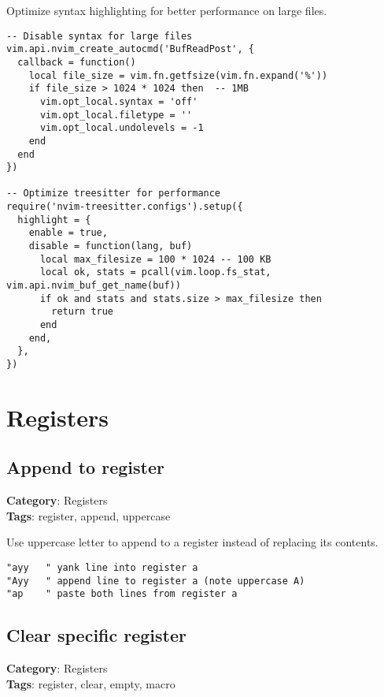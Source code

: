 {{{{{{{{{Optimize syntax highlighting for better performance on large files.

\begin{Exa*}{}
\begin{Verbatim}[fontsize=\footnotesize, breaklines, breakanywhere]
-- Disable syntax for large files
vim.api.nvim_create_autocmd('BufReadPost', {
  callback = function()
    local file_size = vim.fn.getfsize(vim.fn.expand('%'))
    if file_size > 1024 * 1024 then  -- 1MB
      vim.opt_local.syntax = 'off'
      vim.opt_local.filetype = ''
      vim.opt_local.undolevels = -1
    end
  end
})

-- Optimize treesitter for performance
require('nvim-treesitter.configs').setup({
  highlight = {
    enable = true,
    disable = function(lang, buf)
      local max_filesize = 100 * 1024 -- 100 KB
      local ok, stats = pcall(vim.loop.fs_stat, vim.api.nvim_buf_get_name(buf))
      if ok and stats and stats.size > max_filesize then
        return true
      end
    end,
  },
})
\end{Verbatim}
\end{Exa*}

\chapter{Registers}
\section{Append to register}

\textbf{Category}: Registers\\ \textbf{Tags}: register, append, uppercase
\vspace{0.5cm}

Use uppercase letter to append to a register instead of replacing its contents.

\begin{Exa*}{}
\begin{Verbatim}[fontsize=\footnotesize, breaklines, breakanywhere]
"ayy   " yank line into register a
"Ayy   " append line to register a (note uppercase A)
"ap    " paste both lines from register a
\end{Verbatim}
\end{Exa*}

\section{Clear specific register}

\textbf{Category}: Registers\\ \textbf{Tags}: register, clear, empty, macro
\vspace{0.5cm}

}}}}}}}}}
